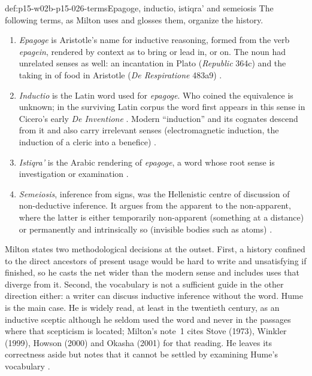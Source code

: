 \begin{hbdefinition}{def:p15-w02b-p15-026-terms}{Epagoge, inductio, istiqra' and semeiosis}
The following terms, as Milton uses and glosses them, organize the history.
\begin{enumerate}
\item \emph{Epagoge} is Aristotle's name for inductive reasoning, formed
  from the verb \emph{epagein}, rendered by context as to bring or lead
  in, or on. The noun had unrelated senses as well: an incantation in
  Plato (\emph{Republic} 364c) and the taking in of food in Aristotle
  (\emph{De Respiratione} 483a9)
  \cite[p.~2]{Milton2011InductionBeforeHume}.
\item \emph{Inductio} is the Latin word used for \emph{epagoge}. Who
  coined the equivalence is unknown; in the surviving Latin corpus the
  word first appears in this sense in Cicero's early \emph{De Inventione}
  \cite[p.~11]{Milton2011InductionBeforeHume}. Modern ``induction'' and
  its cognates descend from it and also carry irrelevant senses
  (electromagnetic induction, the induction of a cleric into a benefice)
  \cite[p.~1]{Milton2011InductionBeforeHume}.
\item \emph{Istiqra'} is the Arabic rendering of \emph{epagoge}, a word
  whose root sense is investigation or examination
  \cite[p.~14]{Milton2011InductionBeforeHume}.
\item \emph{Semeiosis}, inference from signs, was the Hellenistic centre
  of discussion of non-deductive inference. It argues from the apparent to
  the non-apparent, where the latter is either temporarily non-apparent
  (something at a distance) or permanently and intrinsically so (invisible
  bodies such as atoms) \cite[p.~1]{Milton2011InductionBeforeHume}.
\end{enumerate}
\end{hbdefinition}

Milton states two methodological decisions at the outset. First, a history
confined to the direct ancestors of present usage would be hard to write
and unsatisfying if finished, so he casts the net wider than the modern
sense and includes uses that diverge from it. Second, the vocabulary is not
a sufficient guide in the other direction either: a writer can discuss
inductive inference without the word. Hume is the main case. He is widely
read, at least in the twentieth century, as an inductive sceptic although
he seldom used the word and never in the passages where that scepticism
is located; Milton's note~1 cites Stove (1973), Winkler (1999), Howson
(2000) and Okasha (2001) for that reading. He leaves its correctness
aside but notes
that it cannot be settled by examining Hume's vocabulary
\cite[p.~1]{Milton2011InductionBeforeHume}.

